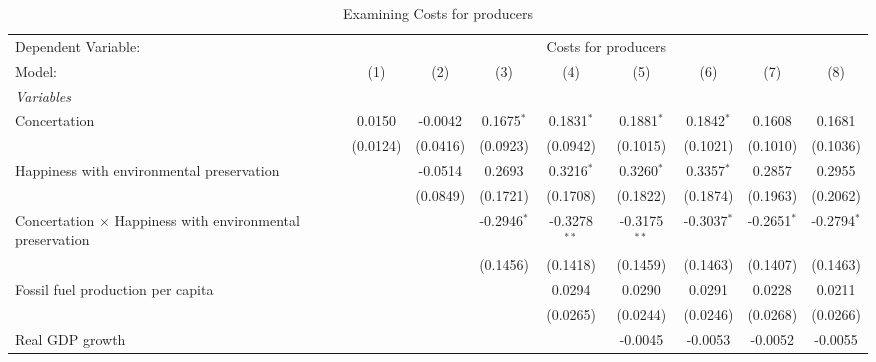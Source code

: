 
\begin{table}[htbp]
   \caption{Examining Costs for producers}
   \centering
   \begin{tabular}{lcccccccc}
      \tabularnewline \midrule \midrule
      Dependent Variable: & \multicolumn{8}{c}{Costs for producers}\\
      Model:                                                           & (1)      & (2)      & (3)           & (4)            & (5)            & (6)           & (7)            & (8)\\  
      \midrule
      \emph{Variables}\\
      Concertation                                                     & 0.0150   & -0.0042  & 0.1675$^{*}$  & 0.1831$^{*}$   & 0.1881$^{*}$   & 0.1842$^{*}$  & 0.1608         & 0.1681\\   
                                                                       & (0.0124) & (0.0416) & (0.0923)      & (0.0942)       & (0.1015)       & (0.1021)      & (0.1010)       & (0.1036)\\   
      Happiness with environmental preservation                        &          & -0.0514  & 0.2693        & 0.3216$^{*}$   & 0.3260$^{*}$   & 0.3357$^{*}$  & 0.2857         & 0.2955\\   
                                                                       &          & (0.0849) & (0.1721)      & (0.1708)       & (0.1822)       & (0.1874)      & (0.1963)       & (0.2062)\\   
      Concertation $\times$ Happiness with environmental preservation  &          &          & -0.2946$^{*}$ & -0.3278$^{**}$ & -0.3175$^{**}$ & -0.3037$^{*}$ & -0.2651$^{*}$  & -0.2794$^{*}$\\   
                                                                       &          &          & (0.1456)      & (0.1418)       & (0.1459)       & (0.1463)      & (0.1407)       & (0.1463)\\   
      Fossil fuel production per capita                                &          &          &               & 0.0294         & 0.0290         & 0.0291        & 0.0228         & 0.0211\\   
                                                                       &          &          &               & (0.0265)       & (0.0244)       & (0.0246)      & (0.0268)       & (0.0266)\\   
      Real GDP growth                                                  &          &          &               &                & -0.0045        & -0.0053       & -0.0052        & -0.0055\\   

\end{tabular}
\end{table}
